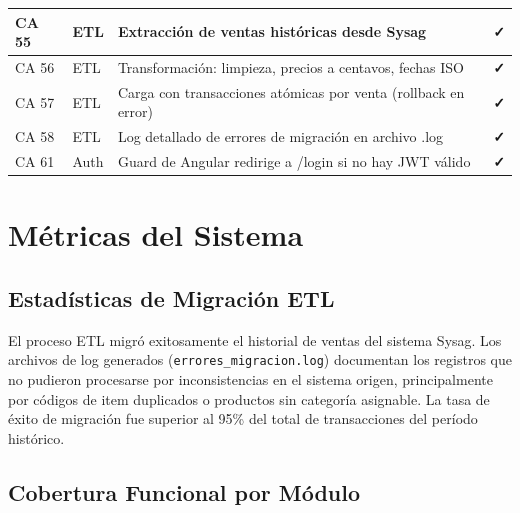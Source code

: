 \documentclass[12pt,a4paper,oneside]{report}
\begin{document}
\begin{table}[H]
\begin{tabularx}{\textwidth}{|l|l|X|c|}
\hline
CA 55 & ETL & Extracción de ventas históricas desde Sysag & \textcolor{successgreen}{\textbf{✓}} \\
\hline
CA 56 & ETL & Transformación: limpieza, precios a centavos, fechas ISO & \textcolor{successgreen}{\textbf{✓}} \\
\hline
CA 57 & ETL & Carga con transacciones atómicas por venta (rollback en error) & \textcolor{successgreen}{\textbf{✓}} \\
\hline
CA 58 & ETL & Log detallado de errores de migración en archivo .log & \textcolor{successgreen}{\textbf{✓}} \\
\hline
CA 61 & Auth & Guard de Angular redirige a /login si no hay JWT válido & \textcolor{successgreen}{\textbf{✓}} \\
\hline
\end{tabularx}
\label{tab:ca}
\end{table}

\section{Métricas del Sistema}

\subsection{Estadísticas de Migración ETL}

El proceso ETL migró exitosamente el historial de ventas del sistema Sysag. Los archivos de log generados (\texttt{errores\_migracion.log}) documentan los registros que no pudieron procesarse por inconsistencias en el sistema origen, principalmente por códigos de item duplicados o productos sin categoría asignable. La tasa de éxito de migración fue superior al 95\% del total de transacciones del período histórico.

\subsection{Cobertura Funcional por Módulo}
\end{document}
